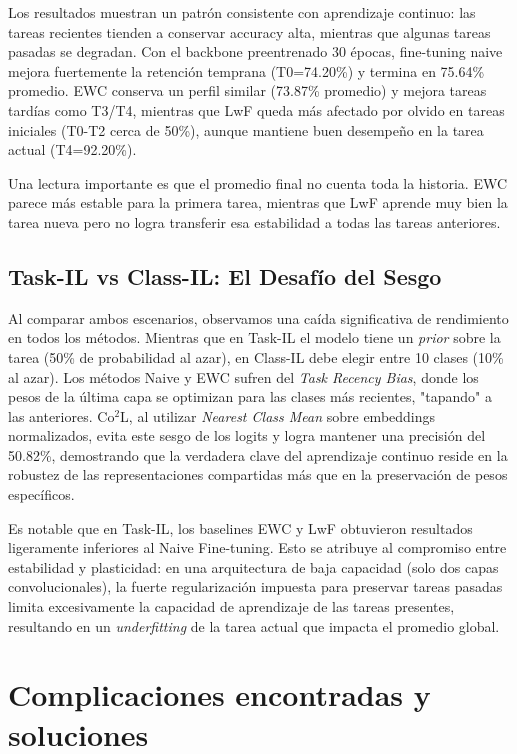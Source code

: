 \documentclass[10pt,a4paper]{article}
\begin{document}
Los resultados muestran un patrón consistente con aprendizaje continuo: las tareas recientes tienden a conservar accuracy alta, mientras que algunas tareas pasadas se degradan. Con el backbone preentrenado 30 épocas, fine-tuning naive mejora fuertemente la retención temprana (T0=74.20\%) y termina en 75.64\% promedio. EWC conserva un perfil similar (73.87\% promedio) y mejora tareas tardías como T3/T4, mientras que LwF queda más afectado por olvido en tareas iniciales (T0-T2 cerca de 50\%), aunque mantiene buen desempeño en la tarea actual (T4=92.20\%).

Una lectura importante es que el promedio final no cuenta toda la historia. EWC parece más estable para la primera tarea, mientras que LwF aprende muy bien la tarea nueva pero no logra transferir esa estabilidad a todas las tareas anteriores. 

\subsection{Task-IL vs Class-IL: El Desafío del Sesgo}
Al comparar ambos escenarios, observamos una caída significativa de rendimiento en todos los métodos. Mientras que en Task-IL el modelo tiene un \textit{prior} sobre la tarea (50\% de probabilidad al azar), en Class-IL debe elegir entre 10 clases (10\% al azar). Los métodos Naive y EWC sufren del \textit{Task Recency Bias}, donde los pesos de la última capa se optimizan para las clases más recientes, "tapando" a las anteriores. Co$^2$L, al utilizar \textit{Nearest Class Mean} sobre embeddings normalizados, evita este sesgo de los logits y logra mantener una precisión del 50.82\%, demostrando que la verdadera clave del aprendizaje continuo reside en la robustez de las representaciones compartidas más que en la preservación de pesos específicos.

Es notable que en Task-IL, los baselines EWC y LwF obtuvieron resultados ligeramente inferiores al Naive Fine-tuning. Esto se atribuye al compromiso entre estabilidad y plasticidad: en una arquitectura de baja capacidad (solo dos capas convolucionales), la fuerte regularización impuesta para preservar tareas pasadas limita excesivamente la capacidad de aprendizaje de las tareas presentes, resultando en un \textit{underfitting} de la tarea actual que impacta el promedio global.

\section{Complicaciones encontradas y soluciones}
\end{document}
